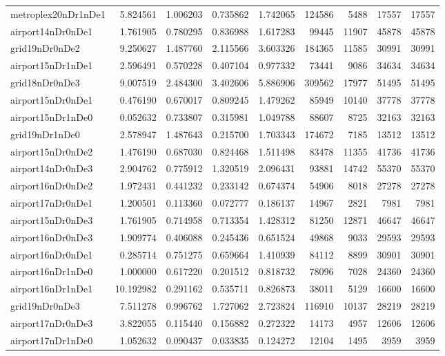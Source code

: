 \begin{longtable}{|l|r|r|r|r|r|r|r|r|}
metroplex20nDr1nDe1 & 5.824561 & 1.006203 & 0.735862 & 1.742065 & 124586 & 5488 & 17557 & 17557 \\
airport14nDr0nDe1 & 1.761905 & 0.780295 & 0.836988 & 1.617283 & 99445 & 11907 & 45878 & 45878 \\
grid19nDr0nDe2 & 9.250627 & 1.487760 & 2.115566 & 3.603326 & 184365 & 11585 & 30991 & 30991 \\
airport15nDr1nDe1 & 2.596491 & 0.570228 & 0.407104 & 0.977332 & 73441 & 9086 & 34634 & 34634 \\
grid18nDr0nDe3 & 9.007519 & 2.484300 & 3.402606 & 5.886906 & 309562 & 17977 & 51495 & 51495 \\
airport15nDr0nDe1 & 0.476190 & 0.670017 & 0.809245 & 1.479262 & 85949 & 10140 & 37778 & 37778 \\
airport15nDr1nDe0 & 0.052632 & 0.733807 & 0.315981 & 1.049788 & 88607 & 8725 & 32163 & 32163 \\
grid19nDr1nDe0 & 2.578947 & 1.487643 & 0.215700 & 1.703343 & 174672 & 7185 & 13512 & 13512 \\
airport15nDr0nDe2 & 1.476190 & 0.687030 & 0.824468 & 1.511498 & 83478 & 11355 & 41736 & 41736 \\
airport14nDr0nDe3 & 2.904762 & 0.775912 & 1.320519 & 2.096431 & 93881 & 14742 & 55370 & 55370 \\
airport16nDr0nDe2 & 1.972431 & 0.441232 & 0.233142 & 0.674374 & 54906 & 8018 & 27278 & 27278 \\
airport17nDr0nDe1 & 1.200501 & 0.113360 & 0.072777 & 0.186137 & 14967 & 2821 & 7981 & 7981 \\
airport15nDr0nDe3 & 1.761905 & 0.714958 & 0.713354 & 1.428312 & 81250 & 12871 & 46647 & 46647 \\
airport16nDr0nDe3 & 1.909774 & 0.406088 & 0.245436 & 0.651524 & 49868 & 9033 & 29593 & 29593 \\
airport16nDr0nDe1 & 0.285714 & 0.751275 & 0.659664 & 1.410939 & 84112 & 8899 & 30901 & 30901 \\
airport16nDr1nDe0 & 1.000000 & 0.617220 & 0.201512 & 0.818732 & 78096 & 7028 & 24360 & 24360 \\
airport16nDr1nDe1 & 10.192982 & 0.291162 & 0.535711 & 0.826873 & 38011 & 5129 & 16600 & 16600 \\
grid19nDr0nDe3 & 7.511278 & 0.996762 & 1.727062 & 2.723824 & 116910 & 10137 & 28219 & 28219 \\
airport17nDr0nDe3 & 3.822055 & 0.115440 & 0.156882 & 0.272322 & 14173 & 4957 & 12606 & 12606 \\
airport17nDr1nDe0 & 1.052632 & 0.090437 & 0.033835 & 0.124272 & 12104 & 1495 & 3959 & 3959 \\

\end{longtable}
